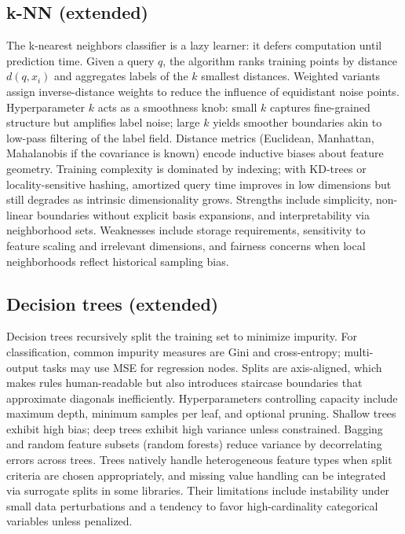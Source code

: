\documentclass[11pt,a4paper]{article}
\begin{document}
\subsection*{k-NN (extended)}
The k-nearest neighbors classifier is a lazy learner: it defers computation until prediction time. Given a query $q$, the algorithm ranks training points by distance $d(q,x_i)$ and aggregates labels of the $k$ smallest distances. Weighted variants assign inverse-distance weights to reduce the influence of equidistant noise points. Hyperparameter $k$ acts as a smoothness knob: small $k$ captures fine-grained structure but amplifies label noise; large $k$ yields smoother boundaries akin to low-pass filtering of the label field. Distance metrics (Euclidean, Manhattan, Mahalanobis if the covariance is known) encode inductive biases about feature geometry. Training complexity is dominated by indexing; with KD-trees or locality-sensitive hashing, amortized query time improves in low dimensions but still degrades as intrinsic dimensionality grows. Strengths include simplicity, non-linear boundaries without explicit basis expansions, and interpretability via neighborhood sets. Weaknesses include storage requirements, sensitivity to feature scaling and irrelevant dimensions, and fairness concerns when local neighborhoods reflect historical sampling bias.

\subsection*{Decision trees (extended)}
Decision trees recursively split the training set to minimize impurity. For classification, common impurity measures are Gini and cross-entropy; multi-output tasks may use MSE for regression nodes. Splits are axis-aligned, which makes rules human-readable but also introduces staircase boundaries that approximate diagonals inefficiently. Hyperparameters controlling capacity include maximum depth, minimum samples per leaf, and optional pruning. Shallow trees exhibit high bias; deep trees exhibit high variance unless constrained. Bagging and random feature subsets (random forests) reduce variance by decorrelating errors across trees. Trees natively handle heterogeneous feature types when split criteria are chosen appropriately, and missing value handling can be integrated via surrogate splits in some libraries. Their limitations include instability under small data perturbations and a tendency to favor high-cardinality categorical variables unless penalized.
\end{document}
